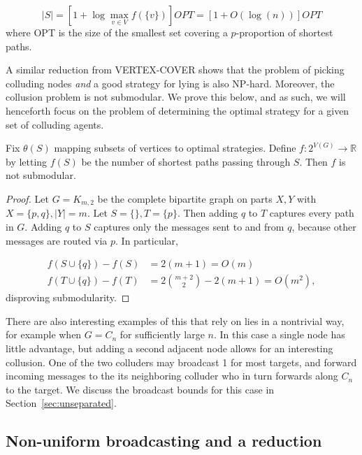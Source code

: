 \documentclass{comnet}
\begin{document}
$$ |S| = \left [ 1 + \log \max_{v \in V} f(\{ v \}) \right ] OPT
       = \left [ 1 + O(\log(n)) \right ] OPT$$
where OPT is the size of the smallest set covering a $p$-proportion of shortest
paths. 

A similar reduction from VERTEX-COVER shows that the problem of picking
colluding nodes \emph{and} a good strategy for lying is also NP-hard. Moreover,
the collusion problem is not submodular. We prove this below, and as such, we
will henceforth focus on the problem of determining the optimal strategy for a
given set of colluding agents.

\begin{proposition} \label{prop:not-submodular}

Fix $\theta(S)$ mapping subsets of vertices to optimal strategies. Define $f:
2^{V(G)} \to \mathbb{R}$ by letting $f(S)$ be the number of shortest paths passing through $S$. Then $f$ is not submodular.
\end{proposition}

\begin{proof}

Let $G = K_{m,2}$ be the complete bipartite graph on parts $X,Y$ with $X = \{
p,q \}, |Y|=m$. Let $S = \{ \}, T = \{ p \}$. Then adding $q$ to $T$ captures
every path in $G$. Adding $q$ to $S$ captures only the messages sent to and
from $q$, because other messages are routed via $p$. In particular,

\begin{align*}
   f(S \cup \{ q \}) - f(S) &= 2(m+1) = O(m) \\ 
   f(T \cup \{ q \}) - f(T) &= 2 \binom{m+2}{2} - 2(m+1) = O(m^2),
\end{align*}
disproving submodularity. 
\end{proof}

There are also interesting examples of this that rely on lies in a nontrivial
way, for example when $G = C_n$ for sufficiently large $n$. In this case a
single node has little advantage, but adding a second adjacent node allows for
an interesting collusion. One of the two colluders may broadcast 1 for most
targets, and forward incoming messages to the its neighboring colluder who in
turn forwards along $C_n$ to the target. We discuss the broadcast bounds for
this case in Section~\ref{sec:unseparated}.

\subsection{Non-uniform broadcasting and a reduction} \label{sec:reduction}
\end{document}
